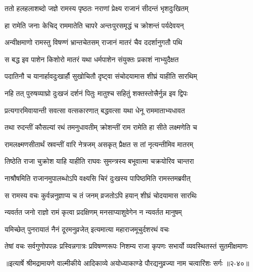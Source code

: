 \twolineshloka
{ततो हलहलाशब्दो जज्ञे रामस्य पृष्ठतः}
{नराणां प्रेक्ष्य राजानं सीदन्तं भृशदुःखितम्} %

\twolineshloka
{हा रामेति जनाः केचिद् राममातेति चापरे}
{अन्तःपुरसमृद्धं च क्रोशन्तं पर्यदेवयन्} %

\twolineshloka
{अन्वीक्षमाणो रामस्तु विषण्णं भ्रान्तचेतसम्}
{राजानं मातरं चैव ददर्शानुगतौ पथि} %

\twolineshloka
{स बद्ध इव पाशेन किशोरो मातरं यथा}
{धर्मपाशेन संयुक्तः प्रकाशं नाभ्युदैक्षत} %

\twolineshloka
{पदातिनौ च यानार्हावदुःखार्हौ सुखोचितौ}
{दृष्ट्वा संचोदयामास शीघ्रं याहीति सारथिम्} %

\twolineshloka
{नहि तत् पुरुषव्याघ्रो दुःखजं दर्शनं पितुः}
{मातुश्च सहितुं शक्तस्तोत्त्रैर्नुन्न इव द्विपः} %

\twolineshloka
{प्रत्यगारमिवायान्ती सवत्सा वत्सकारणात्}
{बद्धवत्सा यथा धेनू राममाताभ्यधावत} %

\twolineshloka
{तथा रुदन्तीं कौसल्यां रथं तमनुधावतीम्}
{क्रोशन्तीं राम रामेति हा सीते लक्ष्मणेति च} %

\twolineshloka
{रामलक्ष्मणसीतार्थं स्रवन्तीं वारि नेत्रजम्}
{असकृत् प्रैक्षत स तां नृत्यन्तीमिव मातरम्} %

\twolineshloka
{तिष्ठेति राजा चुक्रोश याहि याहीति राघवः}
{सुमन्त्रस्य बभूवात्मा चक्रयोरिव चान्तरा} %

\twolineshloka
{नाश्रौषमिति राजानमुपालब्धोऽपि वक्ष्यसि}
{चिरं दुःखस्य पापिष्ठमिति रामस्तमब्रवीत्} %

\twolineshloka
{स रामस्य वचः कुर्वन्ननुज्ञाप्य च तं जनम्}
{व्रजतोऽपि हयान् शीघ्रं चोदयामास सारथिः} %

\twolineshloka
{न्यवर्तत जनो राज्ञो रामं कृत्वा प्रदक्षिणम्}
{मनसाप्याशुवेगेन न न्यवर्तत मानुषम्} %

\twolineshloka
{यमिच्छेत् पुनरायातं नैनं दूरमनुव्रजेत्}
{इत्यमात्या महाराजमूचुर्दशरथं वचः} %

\twolineshloka
{तेषां वचः सर्वगुणोपपन्नः प्रस्विन्नगात्रः प्रविषण्णरूपः}
{निशम्य राजा कृपणः सभार्यो व्यवस्थितस्तं सुतमीक्षमाणः} %


॥इत्यार्षे श्रीमद्रामायणे वाल्मीकीये आदिकाव्ये अयोध्याकाण्डे पौरद्यनुव्रज्या नाम चत्वारिंशः सर्गः ॥२-४०॥
